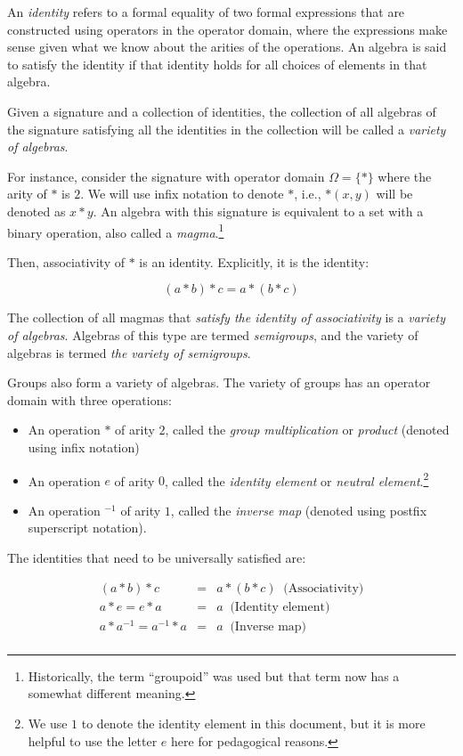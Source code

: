 An {\em identity} refers to a formal equality of two formal
expressions that are constructed using operators in the operator
domain, where the expressions make sense given what we know about the
arities of the operations. An algebra is said to satisfy the identity
if that identity holds for all choices of elements in that
algebra.

Given a signature and a collection of identities, the collection of
all algebras of the signature satisfying all the identities in the
collection will be called a {\em variety of algebras}.

For instance, consider the signature with operator domain $\Omega = \{
* \}$ where the arity of $*$ is $2$. We will use infix notation to
denote $*$, i.e., $*(x,y)$ will be denoted as $x * y$. An algebra with
this signature is equivalent to a set with a binary operation, also
called a {\em magma}.\footnote{Historically, the term ``groupoid'' was
  used but that term now has a somewhat different meaning.}

Then, associativity of $*$ is an identity. Explicitly, it is the identity:

$$(a * b) * c = a * (b * c)$$

The collection of all magmas that {\em satisfy the identity of
  associativity} is a {\em variety of algebras}. Algebras of this type
are termed {\em semigroups}, and the variety of algebras is termed
{\em the variety of semigroups}.

Groups also form a variety of algebras. The variety of groups has an
operator domain with three operations:

\begin{itemize}
\item An operation $*$ of arity $2$, called the {\em group
  multiplication} or {\em product} (denoted using infix notation)
\item An operation $e$ of arity $0$, called the {\em identity element}
  or {\em neutral element}.\footnote{We use $1$ to denote the identity
    element in this document, but it is more helpful to use the letter
    $e$ here for pedagogical reasons.}
\item An operation ${}^{-1}$ of arity $1$, called the {\em inverse
  map} (denoted using postfix superscript notation).
\end{itemize}

The identities that need to be universally satisfied are:

\begin{eqnarray*}
  (a * b) * c & = & a * (b * c) \ \text{ (Associativity)}\\
  a * e = e * a & = &  a \ \text{ (Identity element)}\\
  a * a^{-1} = a^{-1} * a & = & a \ \text{ (Inverse map)}\\
\end{eqnarray*}

